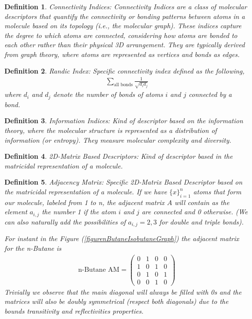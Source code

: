 \documentclass[12pt,letterpaper]{article}
\newtheorem{definition}{Definition}
\begin{document}
\begin{multicols}{2}
\begin{definition}
Connectivity Indices: Connectivity Indices are a class of molecular descriptors that quantify the connectivity or bonding patterns between atoms in a molecule based on its topology (i.e., the molecular graph). These indices capture the degree to which atoms are connected, considering how atoms are bonded to each other rather than their physical 3D arrangement. They are typically derived from graph theory, where atoms are represented as vertices and bonds as edges.\cite{connectivityIndicesArticle}
\end{definition}

\begin{definition}
Randic Index: Specific connectivity index defined as the following,
\begin{align}
\sum_{\text{all bonds}}\frac{1}{\sqrt{d_id_j}}
\end{align}
where $d_i$ and $d_j$ denote the number of bonds of atoms $i$ and $j$ connected by a bond.\cite{RandicIndexArticle}
\end{definition}

\begin{definition}
Information Indices: Kind of descriptor based on the information theory, where the molecular structure is represented as a distribution of information (or entropy). They measure molecular complexity and diversity.
\end{definition}

\begin{definition}
2D-Matrix Based Descriptors: Kind of descriptor based in the matricidal representation of a molecule\cite{DescriptorsBookClassification}. 
\end{definition}

\begin{definition}\label{AdjacencyMatrixDefinition}
Adjacency Matrix: Specific 2D-Matrix Based Descriptor based on the matricidal representation of a molecule. If we have $\{x\}_{i=1}^n$ atoms that form our molecule, labeled from 1 to n, the adjacent matrix $A$ will contain as the element $a_{i,j}$ the number 1 if the atom $i$ and $j$ are connected and 0 otherwise. (We can also naturally add the possibilities of $a_{i,j}=2,3$ for double and triple bonds).\par
For instant in the Figure (\ref{figurenButaneIsobutaneGraph}) the adjacent matrix for the n-Butane is
\begin{align}
\text{n-Butane AM}=\begin{pmatrix}
0 & 1 & 0 & 0 \\
1 & 0 & 1 & 0 \\
0 & 1 & 0 & 1 \\
0 & 0 & 1 & 0 
\end{pmatrix}
\end{align}
Trivially we observe that the main diagonal will always be filled with 0s and the matrices will also be doubly symmetrical (respect both diagonals) due to the bounds transitivity and reflectivities properties.
\end{definition}


\end{multicols}
\end{document}
